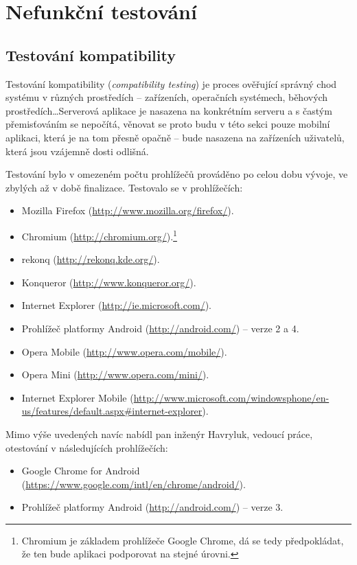 \section{Nefunkční testování}


\subsection{Testování kompatibility}
\label{sec:test:compat}
Testování kompatibility (\textit{compatibility testing}) je proces ověřující správný chod systému v různých prostředích -- zařízeních, operačních systémech, běhových prostředích\dots Serverová aplikace je nasazena na konkrétním serveru a s častým přemisťováním se nepočítá, věnovat se proto budu v této sekci pouze mobilní aplikaci, která je na tom přesně opačně -- bude nasazena na zařízeních uživatelů, která jsou vzájemně dosti odlišná.

Testování bylo v omezeném počtu prohlížečů prováděno po celou dobu vývoje, ve zbylých až v době finalizace. Testovalo se v prohlížečích:
\begin{itemize}
 \item Mozilla Firefox (\url{http://www.mozilla.org/firefox/}).
 \item Chromium (\url{http://chromium.org/}).\footnote{Chromium je základem prohlížeče Google Chrome, dá se tedy předpokládat, že ten bude aplikaci podporovat na stejné úrovni.}
 \item rekonq (\url{http://rekonq.kde.org/}).
 \item Konqueror (\url{http://www.konqueror.org/}).
 \item Internet Explorer (\url{http://ie.microsoft.com/}).
 \item Prohlížeč platformy Android (\url{http://android.com/}) -- verze 2 a 4.
 \item Opera Mobile (\url{http://www.opera.com/mobile/}).
 \item Opera Mini (\url{http://www.opera.com/mini/}).
 \item Internet Explorer Mobile (\url{http://www.microsoft.com/windowsphone/en-us/features/default.aspx#internet-explorer}).
\end{itemize}
Mimo výše uvedených navíc nabídl pan inženýr Havryluk, vedoucí práce, otestování v následujících prohlížečích:
\begin{itemize}
 \item Google Chrome for Android (\url{https://www.google.com/intl/en/chrome/android/}).
 \item Prohlížeč platformy Android (\url{http://android.com/}) -- verze 3.
\end{itemize}

